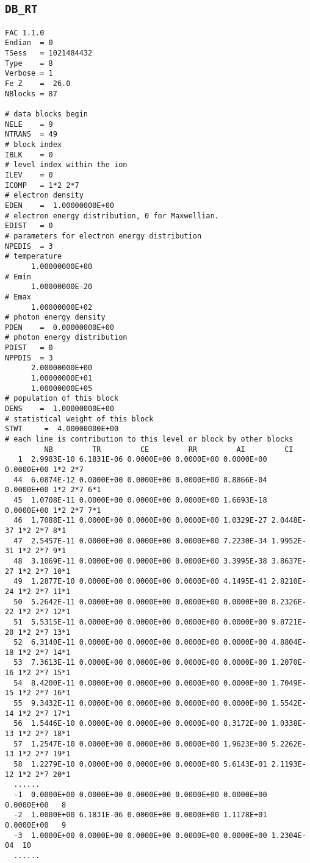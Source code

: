 \documentclass[twoside,letterpaper]{refrep}
\begin{document}
\subsection{\texttt{DB\_RT}}
\begin{verbatim}
FAC 1.1.0
Endian	= 0
TSess	= 1021484432
Type	= 8
Verbose	= 1
Fe Z	=  26.0
NBlocks	= 87

# data blocks begin
NELE	= 9
NTRANS	= 49
# block index
IBLK	= 0
# level index within the ion
ILEV	= 0
ICOMP	= 1*2 2*7 
# electron density
EDEN	=  1.00000000E+00
# electron energy distribution, 0 for Maxwellian.
EDIST	= 0
# parameters for electron energy distribution
NPEDIS	= 3
# temperature
	  1.00000000E+00
# Emin
	  1.00000000E-20
# Emax
	  1.00000000E+02
# photon energy density
PDEN	=  0.00000000E+00
# photon energy distribution
PDIST	= 0
NPPDIS	= 3
	  2.00000000E+00
	  1.00000000E+01
	  1.00000000E+05
# population of this block
DENS	=  1.00000000E+00
# statistical weight of this block
STWT     =  4.00000000E+00
# each line is contribution to this level or block by other blocks
         NB         TR         CE         RR         AI         CI
   1  2.9983E-10 6.1831E-06 0.0000E+00 0.0000E+00 0.0000E+00 0.0000E+00 1*2 2*7 
  44  6.0874E-12 0.0000E+00 0.0000E+00 0.0000E+00 8.8866E-04 0.0000E+00 1*2 2*7 6*1 
  45  1.0708E-11 0.0000E+00 0.0000E+00 0.0000E+00 1.6693E-18 0.0000E+00 1*2 2*7 7*1 
  46  1.7088E-11 0.0000E+00 0.0000E+00 0.0000E+00 1.0329E-27 2.0448E-37 1*2 2*7 8*1 
  47  2.5457E-11 0.0000E+00 0.0000E+00 0.0000E+00 7.2230E-34 1.9952E-31 1*2 2*7 9*1 
  48  3.1069E-11 0.0000E+00 0.0000E+00 0.0000E+00 3.3995E-38 3.8637E-27 1*2 2*7 10*1 
  49  1.2877E-10 0.0000E+00 0.0000E+00 0.0000E+00 4.1495E-41 2.8210E-24 1*2 2*7 11*1 
  50  5.2642E-11 0.0000E+00 0.0000E+00 0.0000E+00 0.0000E+00 8.2326E-22 1*2 2*7 12*1 
  51  5.5315E-11 0.0000E+00 0.0000E+00 0.0000E+00 0.0000E+00 9.8721E-20 1*2 2*7 13*1 
  52  6.3140E-11 0.0000E+00 0.0000E+00 0.0000E+00 0.0000E+00 4.8804E-18 1*2 2*7 14*1 
  53  7.3613E-11 0.0000E+00 0.0000E+00 0.0000E+00 0.0000E+00 1.2070E-16 1*2 2*7 15*1 
  54  8.4200E-11 0.0000E+00 0.0000E+00 0.0000E+00 0.0000E+00 1.7049E-15 1*2 2*7 16*1 
  55  9.3432E-11 0.0000E+00 0.0000E+00 0.0000E+00 0.0000E+00 1.5542E-14 1*2 2*7 17*1 
  56  1.5446E-10 0.0000E+00 0.0000E+00 0.0000E+00 8.3172E+00 1.0338E-13 1*2 2*7 18*1 
  57  1.2547E-10 0.0000E+00 0.0000E+00 0.0000E+00 1.9623E+00 5.2262E-13 1*2 2*7 19*1 
  58  1.2279E-10 0.0000E+00 0.0000E+00 0.0000E+00 5.6143E-01 2.1193E-12 1*2 2*7 20*1 
  ......
  -1  0.0000E+00 0.0000E+00 0.0000E+00 0.0000E+00 0.0000E+00 0.0000E+00   8
  -2  1.0000E+00 6.1831E-06 0.0000E+00 0.0000E+00 1.1178E+01 0.0000E+00   9
  -3  1.0000E+00 0.0000E+00 0.0000E+00 0.0000E+00 0.0000E+00 1.2304E-04  10
  ......
\end{verbatim}
\end{document}
